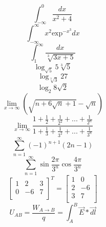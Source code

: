 \documentclass[a4paper]{article}
\begin{document}
$$\int_{-\infty}^{0}\frac{dx}{x^2 + 4}$$
$$\int_{-\infty}^{\infty}x^2 \text{exp}^{-x^3}dx$$
$$\int_{1}^{\infty}\frac{dx}{\sqrt[3]{3x+5}}$$
$$\log_{\sqrt{5}} 5\sqrt[3]{5}$$
$$\log_{\sqrt[3]{3}} 27$$
$$\log_{2} 8\sqrt{2}$$
$$\lim_{x\to\infty} \left(\sqrt{n + 6 \sqrt{n} + 1} - \sqrt{n}\right)$$
$$ \lim_{x\to\infty} \frac{1 + \frac{1}{2} + \frac{1}{2^2} + ... + \frac{1}{2^n}}{1 + \frac{1}{3} + \frac{1}{3^2} + ... + \frac{1}{3^n}} $$
$$\sum_{n=1}^{\infty} (-1)^{n+1}(2n-1)$$
$$\sum_{n=1}^{\infty} \sin\frac{2\pi}{3^n} \cos\frac{4\pi}{3^n} $$
$$\left[ \begin{array}{ccc}
1 & 2 & 3  \\
0 & -6 & 7  \\
\end{array} \right]^T
=
\left[ \begin{array}{cc}
1 & 0  \\
2 & -6  \\
3 & 7 \\
\end{array} \right] $$
$$U_{AB} = \frac{W_{A\to B}}{q} = \int_{A}^{B} \vec{E}* \vec{dl} $$
\end{document}
